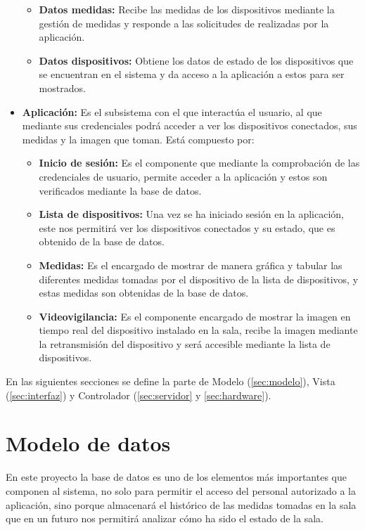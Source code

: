 \begin{itemize}
\begin{itemize}
		      \item \textbf{Datos medidas:} Recibe las medidas de los dispositivos mediante la gestión de medidas y responde a las solicitudes de realizadas por la aplicación.
		      \item \textbf{Datos dispositivos:} Obtiene los datos de estado de los dispositivos que se encuentran en el sistema y da acceso a la aplicación a estos para ser mostrados.
	      \end{itemize}
	\item \textbf{Aplicación:} Es el subsistema con el que interactúa el usuario, al que mediante sus credenciales podrá acceder a ver los dispositivos conectados, sus medidas y la imagen que toman. Está compuesto por:
	      \begin{itemize}
		      \item \textbf{Inicio de sesión:} Es el componente que mediante la comprobación de las credenciales de usuario, permite acceder a la aplicación y estos son verificados mediante la base de datos.
		      \item \textbf{Lista de dispositivos:} Una vez se ha iniciado sesión en la aplicación, este nos permitirá ver los dispositivos conectados y su estado, que es obtenido de la base de datos.
		      \item \textbf{Medidas:} Es el encargado de mostrar de manera gráfica y tabular las diferentes medidas tomadas por el dispositivo de la lista de dispositivos, y estas medidas son obtenidas de la base de datos.
		      \item \textbf{Videovigilancia:} Es el componente encargado de mostrar la imagen en tiempo real del dispositivo instalado en la sala, recibe la imagen mediante la retransmisión del dispositivo y será accesible mediante la lista de dispositivos.
	      \end{itemize}
\end{itemize}

En las siguientes secciones se define la parte de Modelo (\autoref{sec:modelo}), Vista (\autoref{sec:interfaz}) y Controlador (\autoref{sec:servidor} y \autoref{sec:hardware}).
\pagebreak

\section{Modelo de datos}\label{sec:modelo}
En este proyecto la base de datos es uno de los elementos más importantes que componen al sistema, no solo para permitir el acceso del personal autorizado a la aplicación, sino porque almacenará el histórico de las medidas tomadas en la sala que en un futuro nos permitirá analizar cómo ha sido el estado de la sala.

